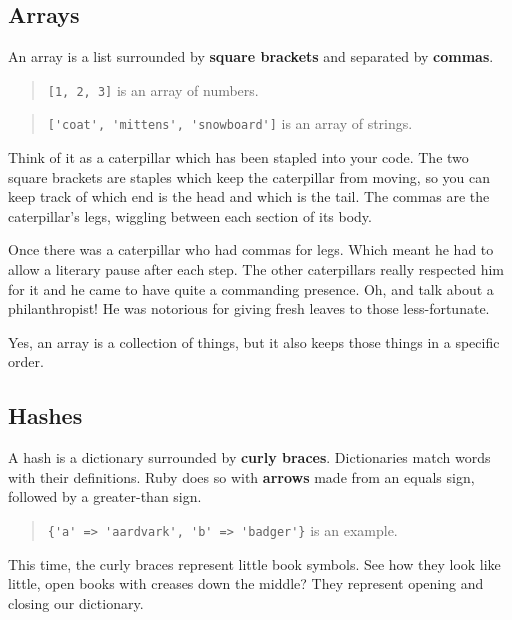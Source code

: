 \documentclass[10pt,twoside]{report}
\begin{document}
\subsection{Arrays}



An array is a list surrounded by {\bf square brackets} and separated
by {\bf commas}.

\begin{quote}
\lstinline[breaklines=true]|[1, 2, 3]| is an array of
numbers.\end{quote}


\begin{quote}
\lstinline[breaklines=true]|['coat', 'mittens', 'snowboard']| is an
array of strings.\end{quote}


Think of it as a caterpillar which has been stapled into your code.
The two square brackets are staples which keep the caterpillar from
moving, so you can keep track of which end is the head and which is
the tail.  The commas are the caterpillar's legs, wiggling between
each section of its body.

Once there was a caterpillar who had commas for legs.  Which meant he
had to allow a literary pause after each step.  The other caterpillars
really respected him for it and he came to have quite a commanding
presence.  Oh, and talk about a philanthropist!  He was notorious for
giving fresh leaves to those less-fortunate.

Yes, an array is a collection of things, but it also keeps those
things in a specific order.




\subsection{Hashes}



A hash is a dictionary surrounded by {\bf curly braces}.  Dictionaries
match words with their definitions.  Ruby does so with {\bf arrows}
made from an equals sign, followed by a greater-than sign.

\begin{quote}
\lstinline[breaklines=true]|{'a' => 'aardvark', 'b' => 'badger'}| is
an example.\end{quote}


This time, the curly braces represent little book symbols.  See how
they look like little, open books with creases down the middle?  They
represent opening and closing our dictionary.
\end{document}
